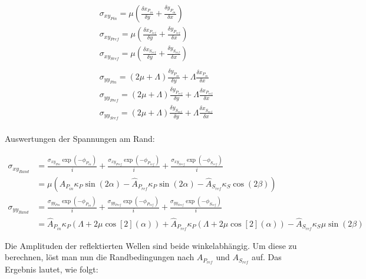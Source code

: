 \begin{solution}
    \begin{align*}
        &\sigma_{xy_{Pin}} = \mu (\frac{\delta x_{P_{in}}}{\delta y} + \frac{\delta y_{P_{in}}}{\delta x}) \\
        &\sigma_{xy_{Pref}} = \mu (\frac{\delta x_{P_{ref}}}{\delta y} + \frac{\delta y_{P_{ref}}}{\delta x}) \\
        &\sigma_{xy_{Sref}} = \mu (\frac{\delta x_{S_{ref}}}{\delta y} + \frac{\delta y_{S_{ref}}}{\delta x}) \\
        \\
        &\sigma_{yy_{Pin}} = (2\mu + \Lambda) \frac{\delta y_{P_{in}}}{\delta y} + \Lambda \frac{\delta x_{P_{in}}}{\delta x} \\
        &\sigma_{yy_{Pref}} = (2\mu + \Lambda) \frac{\delta y_{P_{ref}}}{\delta y} + \Lambda \frac{\delta x_{P_{ref}}}{\delta x} \\
        &\sigma_{yy_{Sref}} = (2\mu + \Lambda) \frac{\delta y_{S_{ref}}}{\delta y} + \Lambda \frac{\delta x_{S_{ref}}}{\delta x} \\
    \end{align*}

    Auswertungen der Spannungen am Rand:

    \begin{align*}
        \sigma_{xy_{Rand}} &= \frac{\sigma_{xy_{Pin}} \exp(-\phi_{P_{in}})}{i} + \frac{\sigma_{xy_{Pref}} \exp(-\phi_{P_{ref}})}{i}
                            + \frac{\sigma_{xy_{Sref}} \exp(-\phi_{S_{ref}})}{i} \\
                           &= \mu (\hat{A}_{P_{in}} \kappa_P \sin(2\alpha) - \hat{A}_{P_{ref}} \kappa_P \sin(2 \alpha) 
                            - \hat{A}_{S_{ref}} \kappa_S \cos(2\beta))\\
        \sigma_{yy_{Rand}} &= \frac{\sigma_{yy_{Pin}} \exp(-\phi_{P_{in}})}{i} + \frac{\sigma_{yy_{Pref}} \exp(-\phi_{P_{ref}})}{i}
                            + \frac{\sigma_{yy_{Sref}} \exp(-\phi_{S_{ref}})}{i} \\
                           &= \hat{A}_{P_{in}} \kappa_P (\Lambda + 2 \mu \cos[2](\alpha)) + \hat{A}_{P_{ref}} \kappa_P (\Lambda + 2 \mu \cos[2](\alpha))
                            - \hat{A}_{S_{ref}} \kappa_S \mu \sin(2\beta)
    \end{align*}

    Die Amplituden der reflektierten Wellen sind beide winkelabhängig. Um diese zu berechnen, löst man nun die Randbedingungen nach 
    $A_{P_{ref}}$ und $ A_{S_{ref}}$ auf. Das Ergebnis lautet, wie folgt:


\end{solution}

